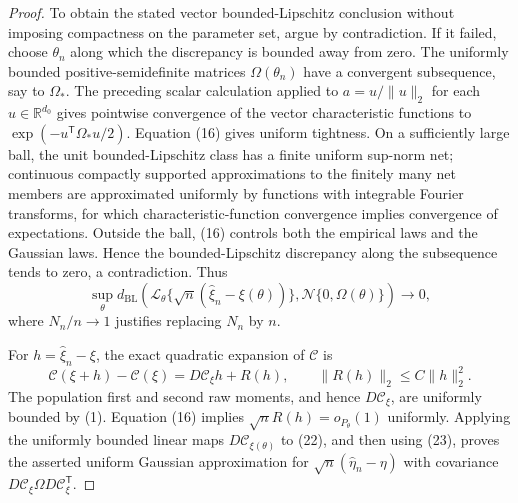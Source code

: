 \documentclass{article}
\begin{document}
\begin{proof}
To obtain the stated vector bounded-Lipschitz conclusion without imposing compactness on the parameter set, argue by contradiction.  If it failed, choose \(\theta_n\) along which the discrepancy is bounded away from zero.  The uniformly bounded positive-semidefinite matrices \(\Omega(\theta_n)\) have a convergent subsequence, say to \(\Omega_*\).  The preceding scalar calculation applied to \(a=u/\lVert u\rVert_2\) for each \(u\in\mathbb R^{d_0}\) gives pointwise convergence of the vector characteristic functions to \(\exp(-u^{\mathsf T}\Omega_*u/2)\).  Equation (16) gives uniform tightness.  On a sufficiently large ball, the unit bounded-Lipschitz class has a finite uniform sup-norm net; continuous compactly supported approximations to the finitely many net members are approximated uniformly by functions with integrable Fourier transforms, for which characteristic-function convergence implies convergence of expectations.  Outside the ball, (16) controls both the empirical laws and the Gaussian laws.  Hence the bounded-Lipschitz discrepancy along the subsequence tends to zero, a contradiction.  Thus
\[
 \sup_\theta d_{\mathrm{BL}}\left(
 \mathcal L_\theta\{\sqrt n(\widehat\xi_n-\xi(\theta))\},
 \mathcal N\{0,\Omega(\theta)\}\right)\longrightarrow0,
\tag{22}
\]
where \(N_n/n\to1\) justifies replacing \(N_n\) by \(n\).

For \(h=\widehat\xi_n-\xi\), the exact quadratic expansion of \(\mathcal C\) is
\[
 \mathcal C(\xi+h)-\mathcal C(\xi)
 =D\mathcal C_\xi h+R(h),
 \qquad \lVert R(h)\rVert_2\leq C\lVert h\rVert_2^2.
\tag{23}
\]
The population first and second raw moments, and hence \(D\mathcal C_\xi\), are uniformly bounded by (1).  Equation (16) implies \(\sqrt nR(h)=o_{P_\theta}(1)\) uniformly.  Applying the uniformly bounded linear maps \(D\mathcal C_{\xi(\theta)}\) to (22), and then using (23), proves the asserted uniform Gaussian approximation for \(\sqrt n(\widehat\eta_n-\eta)\) with covariance \(D\mathcal C_\xi\Omega D\mathcal C_\xi^{\mathsf T}\).


\end{proof}
\end{document}
